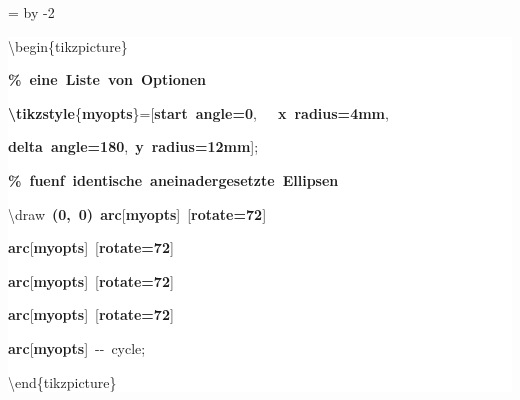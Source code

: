 \begingroup
\ttfamily
{}
=\textwidth
\advance{} by -2\fboxsep
\noindent
\colorbox{background}
{%
\parbox{\dimen255}
{%
\rule[-0.5ex]{0pt}{2.5ex}\hspace*{0.0em}\textbackslash{}begin\{tikzpicture\}\\
\rule[-0.5ex]{0pt}{2.5ex}\hspace*{1.0em}\textcolor{G}{\textbf{\%~eine~Liste~von~Optionen}}\\
\rule[-0.5ex]{0pt}{2.5ex}\hspace*{1.0em}\textcolor{R}{\textbf{\textbackslash{}tikzstyle}}\{\textcolor{B}{\textbf{myopts}}\}=[\textcolor{R}{\textbf{start~angle=0}},~~~\textcolor{R}{\textbf{x~radius=4mm}},\\
\rule[-0.5ex]{0pt}{2.5ex}\hspace*{11.0em}\textcolor{R}{\textbf{delta~angle=180}},~\textcolor{R}{\textbf{y~radius=12mm}}];\\
\rule[-0.5ex]{0pt}{2.5ex}\hspace*{1.0em}\textcolor{G}{\textbf{\%~fuenf~identische~aneinadergesetzte~Ellipsen}}\\
\rule[-0.5ex]{0pt}{2.5ex}\hspace*{1.0em}\textbackslash{}draw~\textcolor{R}{\textbf{(0,~0)}}~\textcolor{R}{\textbf{arc}}[\textcolor{B}{\textbf{myopts}}]~[\textcolor{R}{\textbf{rotate=72}}]\\
\rule[-0.5ex]{0pt}{2.5ex}\hspace*{7.5em}\textcolor{R}{\textbf{arc}}[\textcolor{B}{\textbf{myopts}}]~[\textcolor{R}{\textbf{rotate=72}}]\\
\rule[-0.5ex]{0pt}{2.5ex}\hspace*{7.5em}\textcolor{R}{\textbf{arc}}[\textcolor{B}{\textbf{myopts}}]~[\textcolor{R}{\textbf{rotate=72}}]\\
\rule[-0.5ex]{0pt}{2.5ex}\hspace*{7.5em}\textcolor{R}{\textbf{arc}}[\textcolor{B}{\textbf{myopts}}]~[\textcolor{R}{\textbf{rotate=72}}]\\
\rule[-0.5ex]{0pt}{2.5ex}\hspace*{7.5em}\textcolor{R}{\textbf{arc}}[\textcolor{B}{\textbf{myopts}}]~{-}{-}~cycle;\\
\rule[-0.5ex]{0pt}{2.5ex}\hspace*{0.0em}\textbackslash{}end\{tikzpicture\}}%
}%
\endgroup
